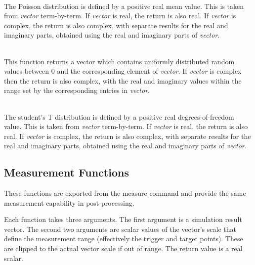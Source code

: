 \begin{description}
\item{}\\
The Poisson distribution is defined by a positive real mean value. 
This is taken from {\it vector} term-by-term.  If {\it vector} is
real, the return is also real.  If {\it vector} is complex, the return
is also complex, with separate results for the real and imaginary
parts, obtained using the real and imaginary parts of {\it vector}.

\item{}\\
This function returns a vector which contains uniformly distributed
random values between 0 and the corresponding element of {\it
vector\/}.  If {\it vector} is complex then the return is also
complex, with the real and imaginary values within the range set by
the corresponding entries in {\it vector}.

\item{}\\
The student's T distribution is defined by a positive real
degrees-of-freedom value.  This is taken from {\it vector}
term-by-term.  If {\it vector} is real, the return is also real.  If
{\it vector} is complex, the return is also complex, with separate
results for the real and imaginary parts, obtained using the real and
imaginary parts of {\it vector}.
\end{description}


\subsection{Measurement Functions}
\label{measfuncs}


These functions are exported from the {\cb measure} command and provide
the same measurement capability in post-processing.

Each function takes three arguments.  The first argument is a
simulation result vector.  The second two arguments are scalar values
of the vector's scale that define the measurement range (effectively
the trigger and target points).  These are clipped to the actual
vector scale if out of range.  The return value is a real scalar.

